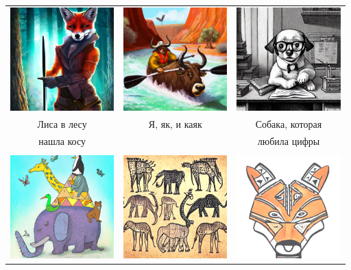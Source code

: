 \documentclass[a5paper,11pt]{memoir}
\begin{document}
\begin{table}[h]
\begin{tabular}{ccc}
\includegraphics[height=4cm]{images/lisa-v-lesu} & \includegraphics[height=4cm]{images/yak-kayak} & \includegraphics[height=4cm]{images/dog-book-cooker}             \\
 Лиса в лесу    &  Я, як, и каяк        &   Собака, которая            \\
  нашла косу &  & любила цифры \\
            &          &              \\
\includegraphics[height=4cm]{images/magic-pyramid} & \includegraphics[height=4cm]{images/cave-stories} & \includegraphics[height=4cm]{images/razukrashki.jpg}             \\

\end{tabular}
\end{table}
\end{document}
